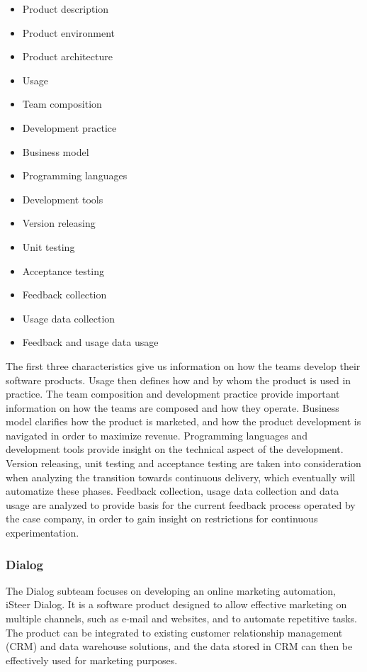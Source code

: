 \documentclass[english, grading]{tktltiki2}
\theoremstyle{definition}
\theoremstyle{remark}
\begin{document}
\begin{multicols}{2}
\begin{itemize}
  \item Product description
  \item Product environment
  \item Product architecture
  \item Usage
  \item Team composition
  \item Development practice
  \item Business model
  \item Programming languages
  \item Development tools
  \item Version releasing
  \item Unit testing
  \item Acceptance testing
  \item Feedback collection
  \item Usage data collection
  \item Feedback and usage data usage
\end{itemize}
\end{multicols}

The first three characteristics give us information on how the teams develop their software products. Usage then defines how and by whom the product is used in practice. The team composition and development practice provide important information on how the teams are composed and how they operate. Business model clarifies how the product is marketed, and how the product development is navigated in order to maximize revenue. Programming languages and development tools provide insight on the technical aspect of the development. Version releasing, unit testing and acceptance testing are taken into consideration when analyzing the transition towards continuous delivery, which eventually will automatize these phases. Feedback collection, usage data collection and data usage are analyzed to provide basis for the current feedback process operated by the case company, in order to gain insight on restrictions for continuous experimentation. 

\subsubsection{Dialog}
The Dialog subteam focuses on developing an online marketing automation, iSteer Dialog. It is a software product designed to allow effective marketing on multiple channels, such as e-mail and websites, and to automate repetitive tasks. The product can be integrated to existing customer relationship management (CRM) and data warehouse solutions, and the data stored in CRM can then be effectively used for marketing purposes. 
\end{document}
